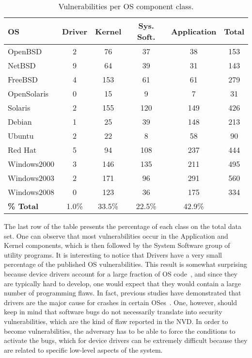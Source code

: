 \begin{table}[!ht]
\caption{Vulnerabilities per OS component class.}
\label{tab:classification}
\begin{center}
{\scriptsize
\begin{tabular}{|l||c|c|c|c||c|}\hline
\textbf{OS} & \textbf{Driver} & \textbf{Kernel} & \textbf{Sys. Soft.} & \textbf{Application} & \textbf{Total}  \\ \hline\hline
OpenBSD 			& 2	 	& 76 		& 37 	& 38 	& 153 \\ %
NetBSD			 	& 9 	& 64 		& 39 	& 31 	& 143 \\ %
FreeBSD 			& 4 	& 153 	& 61	& 61 	& 279 \\ %
OpenSolaris 	& 0 	& 15 		& 9 	& 7 	& 31\\ %
Solaris 			& 2		& 155		& 120	& 149 & 426\\ %
Debian 			& 1 	& 25 		& 39 	& 148 & 213 \\ %
Ubuntu 			& 2 	& 22 		& 8 	& 58 	& 90 	\\ %
Red Hat 			& 5 	& 94  	& 108 & 237 & 444 \\ %
Windows2000     & 3 	& 146	 	& 135 & 211 & 495 \\
Windows2003     & 2 	& 171 	& 96 & 291 & 560 \\
Windows2008     & 0 	& 123 	& 36	& 175	& 334 \\  \hline\hline
\textbf{\% Total} 	& 1.0\% & 33.5\% & 22.5\% & 42.9\% &  \\  \hline
\end{tabular}
}
\end{center}
\end{table}

The last row of the table presents the percentage of each class on the total data set. One can observe that most vulnerabilities occur in the Application and Kernel components, which is then followed by the System Software group of utility programs. It is interesting to notice that Drivers have a very small percentage of the published OS vulnerabilities. This result is somewhat surprising because device drivers account for a large fraction of OS code~\cite{Chou01}, and since they are typically hard to develop, one would expect that they would contain a large number of programming flaws. In fact, previous studies have demonstrated that drivers are the major cause for crashes in certain OSes~\cite{Gan06}. One, however, should keep in mind that software bugs do not necessarily translate into security vulnerabilities, which are the kind of flaw reported in the NVD\@. In order to become vulnerabilities, the adversary has to be able to force the conditions to activate the bugs, which for device drivers can be extremely difficult because they are related to specific low-level aspects of the system.


